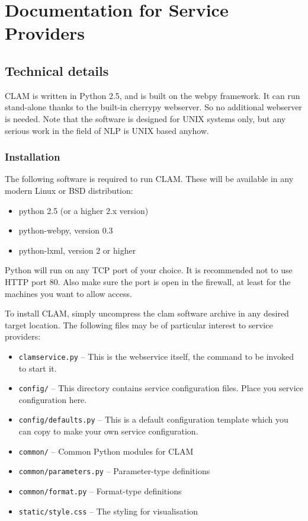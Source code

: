 \documentclass[a4paper,12pt]{report}
\begin{document}
\chapter{Documentation for Service Providers}

\section{Technical details}

CLAM is written in Python 2.5, and is built on the webpy framework. It can run stand-alone thanks to the built-in cherrypy webserver. So no additional webserver is needed. Note that the software is designed for UNIX systems only, but any serious work in the field of NLP is UNIX based anyhow. 


\subsection{Installation}

The following software is required to run CLAM. These will be available in any modern Linux or BSD distribution:

\begin{itemize}
\item python 2.5 (or a higher 2.x version)
\item python-webpy, version 0.3
\item python-lxml, version 2 or higher
\end{itemize}

Python will run on any TCP port of your choice. It is recommended not to use HTTP port 80. Also make sure the port is open in the firewall, at least for the machines you want to allow access.

To install CLAM, simply uncompress the clam software archive in any desired target location. The following files may be of particular interest to service providers:

\begin{itemize}
\item \texttt{clamservice.py} -- This is the webservice itself, the command to be invoked to start it.
\item \texttt{config/} -- This directory contains service configuration files. Place you service configuration here.
\item \texttt{config/defaults.py} -- This is a default configuration template which you can copy to make your own service configuration.
\item \texttt{common/} -- Common Python modules for CLAM
\item \texttt{common/parameters.py} -- Parameter-type definitions
\item \texttt{common/format.py} -- Format-type definitions
\item \texttt{static/style.css} -- The styling for visualisation

\end{itemize}
\end{document}
